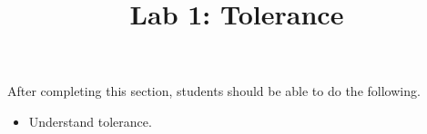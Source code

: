 \documentclass{ximera}
\title{Lab 1: Tolerance}
\begin{document}
\begin{abstract}
\end{abstract}

\maketitle

\begin{sectionOutcomes}

After completing this section, students should be able to do the following.

\begin{itemize}
	\item Understand tolerance.
\end{itemize}
\end{sectionOutcomes}
\end{document}
